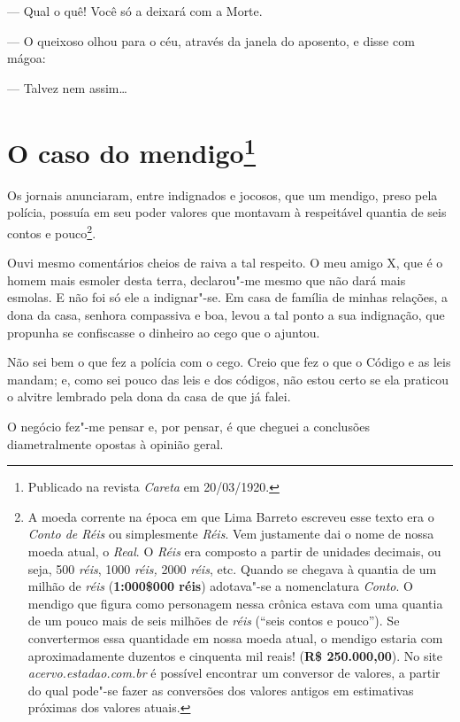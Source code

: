 --- Qual o quê! Você só a deixará com a Morte.

--- O queixoso olhou para o céu, através da janela do aposento, e disse
com mágoa:

--- Talvez nem assim\ldots{}



\chapter[O caso do mendigo]{O caso do mendigo\footnote[*]{Publicado na revista \emph{Careta} em 20/03/1920.}}

Os jornais anunciaram, entre indignados e jocosos, que um mendigo, preso
pela polícia, possuía em seu poder valores que montavam à respeitável
quantia de seis contos e pouco\footnote{A moeda corrente na época em que
  Lima Barreto escreveu esse texto era o \emph{Conto de Réis} ou
  simplesmente \emph{Réis}. Vem justamente dai o nome de nossa moeda
  atual, o \emph{Real}. O \emph{Réis} era composto a partir de unidades
  decimais, ou seja, 500 \emph{réis}, 1000 \emph{réis,} 2000
  \emph{réis}, etc. Quando se chegava à quantia de um milhão de
  \emph{réis} (\textbf{1:000\$000 réis}) adotava"-se a nomenclatura
  \emph{Conto}. O mendigo que figura como personagem nessa crônica
  estava com uma quantia de um pouco mais de seis milhões de \emph{réis}
  (``seis contos e pouco''). Se convertermos essa quantidade em nossa
  moeda atual, o mendigo estaria com aproximadamente duzentos e
  cinquenta mil reais! (\textbf{R\$ 250.000,00}). No site
  \emph{acervo.estadao.com.br} é
  possível encontrar um conversor de valores, a partir do qual pode"-se
  fazer as conversões dos valores antigos em estimativas próximas dos
  valores atuais.}.

Ouvi mesmo comentários cheios de raiva a tal respeito. O meu amigo X,
que é o homem mais esmoler desta terra, declarou"-me mesmo que não dará
mais esmolas. E não foi só ele a indignar"-se. Em casa de família de
minhas relações, a dona da casa, senhora compassiva e boa, levou a tal
ponto a sua indignação, que propunha se confiscasse o dinheiro ao cego
que o ajuntou.

Não sei bem o que fez a polícia com o cego. Creio que fez o que o Código
e as leis mandam; e, como sei pouco das leis e dos códigos, não estou
certo se ela praticou o alvitre lembrado pela dona da casa de que já
falei.

O negócio fez"-me pensar e, por pensar, é que cheguei a conclusões
diametralmente opostas à opinião geral.


